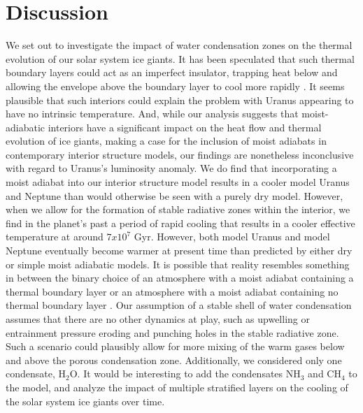 \documentclass[11pt]{ucscthesisbs}
\begin{document}
\chapter{Discussion}
We set out to investigate the impact of water condensation zones on the thermal evolution of our solar system ice giants. It has been speculated that such thermal boundary layers could act as an imperfect insulator, trapping heat below and allowing the envelope above the boundary layer to cool more rapidly \citep{nettelmann_2016,friedson_2017,leconte_2017,podolak_1991,scheibe_2019}. It seems plausible that such interiors could explain the problem with Uranus appearing to have no intrinsic temperature. And, while our analysis suggests that moist-adiabatic interiors have a significant impact on the heat flow and thermal evolution of ice giants, making a case for the inclusion of moist adiabats in contemporary interior structure models, our findings are nonetheless inconclusive with regard to Uranus's luminosity anomaly. We do find that incorporating a moist adiabat into our interior structure model results in a cooler model Uranus and Neptune than would otherwise be seen with a purely dry model. However, when we allow for the formation of stable radiative zones within the interior, we find in the planet's past a period of rapid cooling that results in a cooler effective temperature at around $7 x 10^7$ Gyr. However, both model Uranus and model Neptune eventually become warmer at present time than predicted by either dry or simple moist adiabatic models. It is possible that reality resembles something in between the binary choice of an atmosphere with a moist adiabat containing a thermal boundary layer or an atmosphere with a moist adiabat containing no thermal boundary layer \citep{guillot_2019}. Our assumption of a stable shell of water condensation assumes that there are no other dynamics at play, such as upwelling or entrainment pressure \citep{friedson_2017,2019arXiv190802092G} eroding and punching holes in the stable radiative zone. Such a scenario could plausibly allow for more mixing of the warm gases below and above the porous condensation zone. Additionally, we considered only one condensate, H$_{2}$O. It would be interesting to add the condensates NH$_{3}$ and CH$_{4}$ to the model, and analyze the impact of multiple stratified layers on the cooling of the solar system ice giants over time. 

 

\newcommand{\newblock}{}

\end{document}
